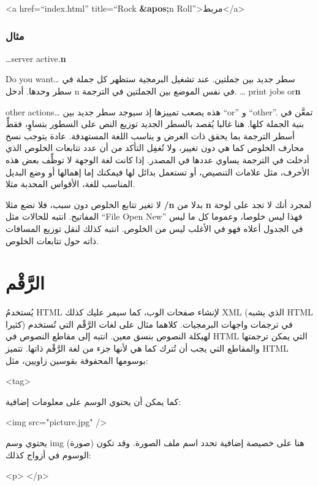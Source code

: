<a href=“index.html” title=“Rock {\bf \&apos;}n Roll”>مربط</a>\NC\AR
\HL
\stoptable
\subsubsection{مثال}
\starttable[|l|l|l|]
\HL
\NC {} \NC {} \NC
{}\NC\AR
\HL
\NC …server active.{\bf {} n}

Do you want…  \NC سطر جديد بين جملتين. عند تشغيل البرمجية ستظهر كل جملة
في سطر وحدها. \NC أدخل ‪ n‬ في نفس الموضع بين الجملتين
في الترجمة.\NC\AR
\HL
\NC … print jobs or{\bf {} n}

other actions…  \NC هذه يصعب تمييزها إذ سيوجد سطر جديد بين “or” و
“other”. \NC تمعَّن في بنية الجملة كلها. هنا غالبا يُقصد بالسطر الجديد
توزيع النص على السطور بتساوٍ، فقطِّ أسطر الترجمة بما يحقق ذات الغرض و
يناسب اللغة المستهدفة.\NC\AR
\HL
\stoptable
عادة يتوجب نسخ محارف الخلوص كما هي دون تغيير، ولا تُغفِل التأكد من أن
عدد تتابعات الخلوص الذي أدخلت في الترجمة يساوي عددها في المصدر. إذا
كانت لغة الوجهة لا توظِّف بعض هذه الأحرف، مثل علامات التنصيص، أو تستعمل
بدائل لها فيمكنك إما إهمالها أو وضع البديل المناسب للغة، الأقواس
المحدبة مثلا.

لا تغير تتابع الخلوص دون سبب، فلا تضع مثلا {\bf ‪/n‬} بدلا من {\bf
‪ n‬} لمجرد أنك لا تجد   على لوحة
المفاتيح. انتبه للحالات مثل “File   Open
  New” فهذا ليس خلوصا، وعموما كل ما ليس في الجدول أعلاه
فهو في الأغلب ليس من الخلوص. انتبه كذلك لنقل توزيع المسافات ذاته حول
تتابعات الخلوص.

\section{الرَّقْم}
يُستخدمُ HTML لإنشاء صفحات الوب، كما سيمر عليك كذلك XML (الذي يشبه HTML
كثيرا) في ترجمات واجهات البرمجيات. كلاهما مثال على لغات الرَّقْم التي
تُستخدم لهيكلة النصوص بنسق معين. انتبه إلى مقاطع النصوص في HTML التي
يمكن ترجمتها والمقاطع التي يجب أن تُترك كما هي لأنها جزء من لغة
الرَّقْم ذاتها. تتميز HTML بوسومها المحفوفة بقوسين زاويين، مثل:

<tag>

كما يمكن أن يحتوي الوسم على معلومات إضافية:

<img src="picture.jpg" />

يحتوي وسم img (صورة) هنا على خصيصة إضافية تحدد اسم ملف الصورة. وقد تكون
الوسوم في أزواج كذلك:

<p> </p>

